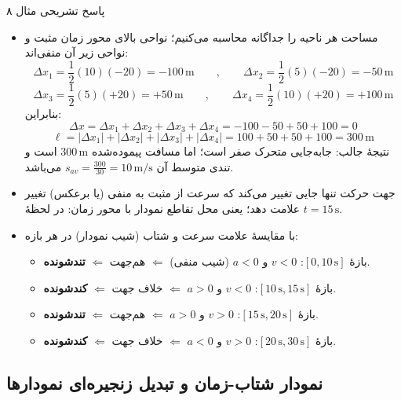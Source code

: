 \documentclass[12pt, a4paper]{article}
\begin{document}
\begin{answerbox}{پاسخ تشریحی مثال ۸}

\begin{itemize}
    \item[الف)] مساحت هر ناحیه را جداگانه محاسبه می‌کنیم؛ نواحی بالای محور زمان مثبت و نواحی زیر آن منفی‌اند:
    \[
    \Delta x_1 = \frac{1}{2}(10)(-20) = -100\,\text{m} \qquad , \qquad \Delta x_2 = \frac{1}{2}(5)(-20) = -50\,\text{m}
    \]
    \[
    \Delta x_3 = \frac{1}{2}(5)(+20) = +50\,\text{m} \qquad , \qquad \Delta x_4 = \frac{1}{2}(10)(+20) = +100\,\text{m}
    \]
    بنابراین:
    \[
    \Delta x = \Delta x_1 + \Delta x_2 + \Delta x_3 + \Delta x_4 = -100 - 50 + 50 + 100 = 0
    \]
    \[
    \ell = |\Delta x_1| + |\Delta x_2| + |\Delta x_3| + |\Delta x_4| = 100 + 50 + 50 + 100 = 300\,\text{m}
    \]
    نتیجهٔ جالب: جابه‌جایی متحرک صفر است؛ اما مسافت پیموده‌شده $300\,\text{m}$ است و تندی متوسط آن $s_{av} = \frac{300}{30} = 10\,\text{m/s}$ می‌باشد.

    \item[ب)] جهت حرکت تنها جایی تغییر می‌کند که سرعت از مثبت به منفی (یا برعکس) تغییر علامت دهد؛ یعنی محل تقاطع نمودار با محور زمان: در لحظهٔ $t = 15\,\text{s}$.

    \item[پ)] با مقایسهٔ علامت سرعت و شتاب (شیب نمودار) در هر بازه:
    \begin{itemize}
        \item بازهٔ $[0, 10\,\text{s}]$: $v<0$ و $a<0$ (شیب منفی) $\Leftarrow$ هم‌جهت $\Leftarrow$ \textbf{تندشونده}.
        \item بازهٔ $[10\,\text{s}, 15\,\text{s}]$: $v<0$ و $a>0$ $\Leftarrow$ خلاف جهت $\Leftarrow$ \textbf{کندشونده}.
        \item بازهٔ $[15\,\text{s}, 20\,\text{s}]$: $v>0$ و $a>0$ $\Leftarrow$ هم‌جهت $\Leftarrow$ \textbf{تندشونده}.
        \item بازهٔ $[20\,\text{s}, 30\,\text{s}]$: $v>0$ و $a<0$ $\Leftarrow$ خلاف جهت $\Leftarrow$ \textbf{کندشونده}.
    \end{itemize}
\end{itemize}
\end{answerbox}

\subsection{نمودار شتاب-زمان و تبدیل زنجیره‌ای نمودارها}
\end{document}
